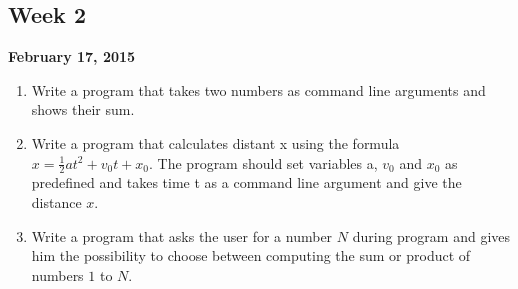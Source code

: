 \documentclass[12pt,letterpaper,twoside]{article}
\begin{document}


\subsection*{Week 2}
\hfill \textbf{February 17, 2015}

\begin{enumerate}\itemsep=0pt
\item Write a program that takes two numbers as command line arguments and shows their sum.
\item Write a program that calculates distant x using the formula $x = \frac{1}{2}at^2 + v_0t+x_0$. The program should set variables a, $v_0$ and $x_0$ as predefined and takes time t as a command line argument and give the distance $x$.
\item Write a program that asks the user for a number $N$ during program and gives him the possibility to choose between computing the sum or product of numbers $1$ to $N$.
\end{enumerate}
\end{document}
